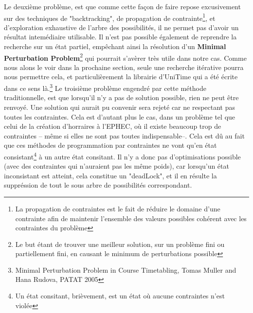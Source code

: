 \indent
Le deuxième problème, est que comme cette façon de faire repose excusivement sur des techniques de "backtracking", de propagation de contrainte\footnote{La propagation de contraintes est le fait de réduire le domaine d'une contrainte afin de maintenir l'ensemble des valeurs possibles cohérent avec les contraintes du problème},
et d'exploration exhaustive de l'arbre des possibilités, il  ne permet pas d'avoir un résultat intemédiaire utilisable.  
Il n'est pas possible également de reprendre la recherche sur un état partiel, empêchant ainsi la résolution d'un \textbf{Minimal Perturbation Problem}\footnote{Le but étant de trouver une meilleur solution, sur un problème fini ou partiellement fini, en causant le minimum de perturbations possible} qui pourrait s'avèrer très utile dans notre cas. \newline
Comme nous alons le voir dans la prochaine section, seule une recherche itérative pourra nous permettre cela, et particulièrement la librairie d'UniTime qui a été écrite dans ce sens là.\footnote{Minimal Perturbation Problem in Course Timetabling, Tomas Muller and Hana Rudova, PATAT 2005 }
\newline
\indent
Le troisième problème engendré par cette méthode traditionnelle, est que lorsqu'il n'y a pas de solution possible, rien ne peut être renvoyé.  Une solution qui aurait pu convenir sera rejeté car ne respectant pas toutes les contraintes. Cela est d'autant plus le cas, dans un problème tel que 
celui de la création d'horraires à l'EPHEC, où il existe beaucoup trop de contraintes -- même si elles ne sont pas toutes indispensable--.  Cela est dû au fait que ces méthodes de programmation par contraintes ne vont qu'en état consistant\footnote{Un état consitant, brièvement, est un état où aucune contraintes n'est violée} à un autre état consitant. Il n'y a donc pas d'optimisations possible (avec des contraintes qui n'auraient pas les même poids), car lorsqu'un état inconsistant est atteint, cela constitue un "deadLock", et il en résulte la suppréssion de tout le sous arbre de possibilités correspondant.\newline
